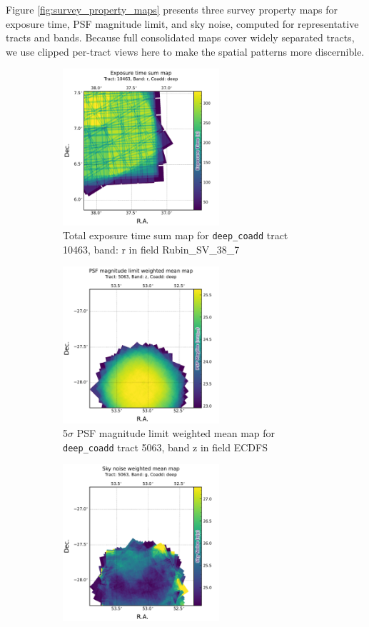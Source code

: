 Figure \ref{fig:survey_property_maps} presents three  survey property maps for exposure time, \gls{PSF} magnitude limit, and sky noise, computed for representative tracts and bands.
Because full consolidated maps cover widely separated tracts, we use clipped per-\gls{tract} views here to make the spatial patterns more discernible.
\begin{figure}[hbt!]
  \centering
  \begin{subfigure}[t]{0.31\textwidth}
  \includegraphics[width=\linewidth, height=5.8cm]{deepCoadd_exposure_time_map_sum_tract10463_rband.pdf}
  \caption{Total exposure time sum map for   \texttt{deep\_coadd} \gls{tract} 10463, band: r in field Rubin\_SV\_38\_7}
  \end{subfigure}\hfill
  \begin{subfigure}[t]{0.31\textwidth}
  \includegraphics[width=\linewidth, height=5.8cm]{deepCoadd_psf_maglim_map_weighted_mean_tract5063_zband.pdf}
  \caption{5$\sigma$ \gls{PSF} magnitude limit weighted mean map for \texttt{deep\_coadd} \gls{tract} 5063, band z in field ECDFS}
  \end{subfigure}\hfill
    \begin{subfigure}[t]{0.31\textwidth}
  \includegraphics[width=\linewidth, height=5.8cm]{deepCoadd_sky_noise_map_weighted_mean_tract5063_gband.pdf}

\end{subfigure}
\end{figure}
